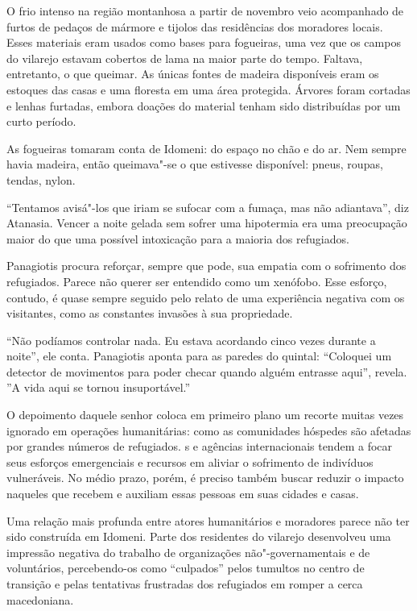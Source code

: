O frio intenso na região montanhosa a partir de novembro veio
acompanhado de furtos de pedaços de mármore e tijolos das residências
dos moradores locais. Esses materiais eram usados como bases para
fogueiras, uma vez que os campos do vilarejo estavam cobertos de lama na
maior parte do tempo. Faltava, entretanto, o que queimar. As únicas
fontes de madeira disponíveis eram os estoques das casas e uma floresta
em uma área protegida. Árvores foram cortadas e lenhas furtadas, embora
doações do material tenham sido distribuídas por um curto período.

As fogueiras tomaram conta de Idomeni: do espaço no chão e do ar. Nem
sempre havia madeira, então queimava"-se o que estivesse disponível:
pneus, roupas, tendas, nylon.

``Tentamos avisá"-los que iriam se sufocar com a fumaça, mas não
adiantava'', diz Atanasia. Vencer a noite gelada sem sofrer uma
hipotermia era uma preocupação maior do que uma possível intoxicação
para a maioria dos refugiados.

Panagiotis procura reforçar, sempre que pode, sua empatia com o
sofrimento dos refugiados. Parece não querer ser entendido como um
xenófobo. Esse esforço, contudo, é quase sempre seguido pelo relato de
uma experiência negativa com os visitantes, como as constantes invasões
à sua propriedade.

``Não podíamos controlar nada. Eu estava acordando cinco vezes durante a
noite'', ele conta. Panagiotis aponta para as paredes do quintal:
``Coloquei um detector de movimentos para poder checar quando alguém
entrasse aqui'', revela. ''A vida aqui se tornou insuportável.''

O depoimento daquele senhor coloca em primeiro plano um recorte muitas
vezes ignorado em operações humanitárias: como as comunidades hóspedes
são afetadas por grandes números de refugiados. s e agências
internacionais tendem a focar seus esforços emergenciais e recursos em
aliviar o sofrimento de indivíduos vulneráveis. No médio prazo, porém, é
preciso também buscar reduzir o impacto naqueles que recebem e auxiliam
essas pessoas em suas cidades e casas.

Uma relação mais profunda entre atores humanitários e moradores parece
não ter sido construída em Idomeni. Parte dos residentes do vilarejo
desenvolveu uma impressão negativa do trabalho de organizações
não"-governamentais e de voluntários, percebendo-os como ``culpados''
pelos tumultos no centro de transição e pelas tentativas frustradas dos
refugiados em romper a cerca macedoniana.

